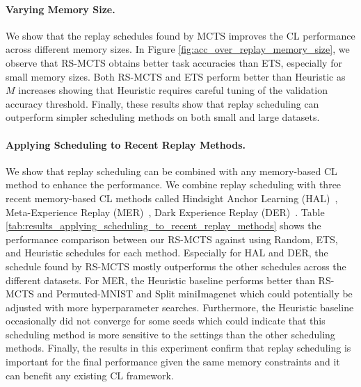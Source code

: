 \paragraph{Varying Memory Size.} We show that the replay schedules found by MCTS improves the CL performance across different memory sizes. In Figure \ref{fig:acc_over_replay_memory_size}, we observe that RS-MCTS obtains better task accuracies than ETS, especially for small memory sizes. Both RS-MCTS and ETS perform better than Heuristic as $M$ increases showing that Heuristic requires careful tuning of the validation accuracy threshold. Finally, these results show that replay scheduling can outperform simpler scheduling methods on both small and large datasets. 

\vspace{-3mm}
\paragraph{Applying Scheduling to Recent Replay Methods.} We show that replay scheduling can be combined with any memory-based CL method to enhance the performance. We combine replay scheduling with three recent memory-based CL methods called Hindsight Anchor Learning (HAL)~\cite{chaudhry2021using}, Meta-Experience Replay (MER)~\cite{riemer2018learning}, Dark Experience Replay (DER)~\cite{buzzega2020dark}. Table \ref{tab:results_applying_scheduling_to_recent_replay_methods} shows the performance comparison between our RS-MCTS against using Random, ETS, and Heuristic schedules for each method. Especially for HAL and DER, the schedule found by RS-MCTS mostly outperforms the other schedules across the different datasets. For MER, the Heuristic baseline performs better than RS-MCTS and Permuted-MNIST and Split miniImagenet which could potentially be adjusted with more hyperparameter searches. Furthermore, the Heuristic baseline occasionally did not converge for some seeds which could indicate that this scheduling method is more sensitive to the settings than the other scheduling methods. Finally, the results in this experiment confirm that replay scheduling is important for the final performance given the same memory constraints and it can benefit any existing CL framework. 




\vspace{-3mm}
